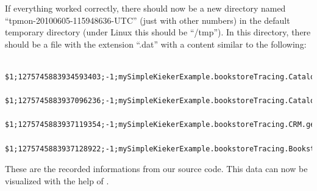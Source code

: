 \documentclass[a4paper, oneside, 11pt]{scrartcl}
\begin{document}
      If everything worked correctly, there should now be a new directory named ``tpmon-20100605-115948636-UTC'' (just with other numbers) in the default temporary directory (under Linux this should be ``/tmp''). In this directory, there should be a file with the extension ``.dat'' with a content similar to the following:
      \begin{lstlisting}
	$1;1275745883934593403;-1;mySimpleKiekerExample.bookstoreTracing.Catalog.getBook(false);sessionID;0;1275745883931011663;1275745883933424540;vnName;1;1
	$1;1275745883937096236;-1;mySimpleKiekerExample.bookstoreTracing.Catalog.getBook(false);sessionID;0;1275745883935003302;1275745883937075214;vnName;3;2
	$1;1275745883937119354;-1;mySimpleKiekerExample.bookstoreTracing.CRM.getOffers();sessionID;0;1275745883934661568;1275745883937111043;vnName;2;1
	$1;1275745883937128922;-1;mySimpleKiekerExample.bookstoreTracing.Bookstore.searchBook();sessionID;0;1275745883931007961;1275745883937123824;vnName;0;0 
      \end{lstlisting}
      These are the recorded informations from our source code. This data can now be visualized with the help of \Kieker.
\end{document}
